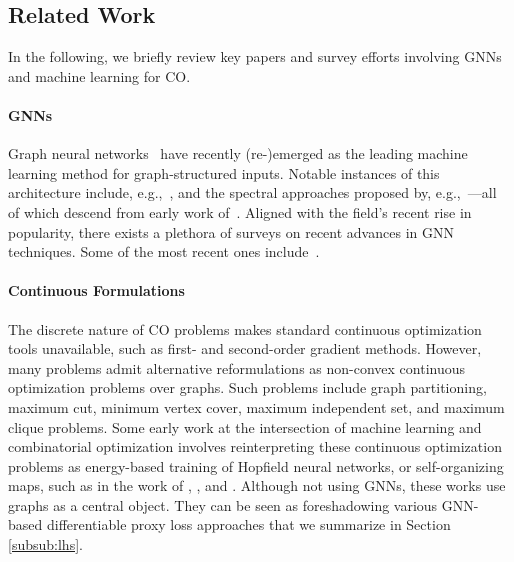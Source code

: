 \documentclass[twoside,11pt]{article}
\begin{document}
\subsection{Related Work}
In the following, we briefly review key papers and survey efforts involving GNNs and machine learning for CO.

\paragraph{GNNs} Graph neural networks~\citep{Gil+2017,Sca+2009} have recently (re-)emerged as the leading machine learning method for graph-structured inputs. Notable instances of this architecture include, e.g.,~\cite{Duv+2015,Ham+2017,Vel+2018}, and the spectral approaches proposed by, e.g.,~\citet{Bru+2014,Defferrard2016,Kip+2017,Mon+2017}---all of which descend from early work of~\citet{Kir+1995,Spe+1997,Mer+2005,Sca+2009}. Aligned with the field's recent rise in popularity, there exists a plethora of surveys on recent advances in GNN techniques. Some of the most recent ones include~\cite{Cha+2020,Wu+2019,Zho+2018}.

\paragraph{Continuous Formulations}The discrete nature of CO problems makes standard continuous optimization tools unavailable, such as first- and second-order gradient methods. However, many problems admit alternative reformulations as non-convex continuous optimization problems over graphs. Such problems include graph partitioning, maximum cut, minimum vertex cover, maximum independent set, and maximum clique problems. Some early work at the intersection of machine learning and combinatorial optimization involves reinterpreting these continuous optimization problems as energy-based training of Hopfield neural networks, or self-organizing maps, such as in the work of \cite{hopfield1985neural}, \cite{durbin1987analogue}, \cite{ramanujam1995mapping} and \cite{gold1996softmax}. Although not using GNNs, these works use graphs as a central object. They can be seen as foreshadowing various GNN-based differentiable proxy loss approaches that we summarize in Section \ref{subsub:lhs}.
\end{document}
